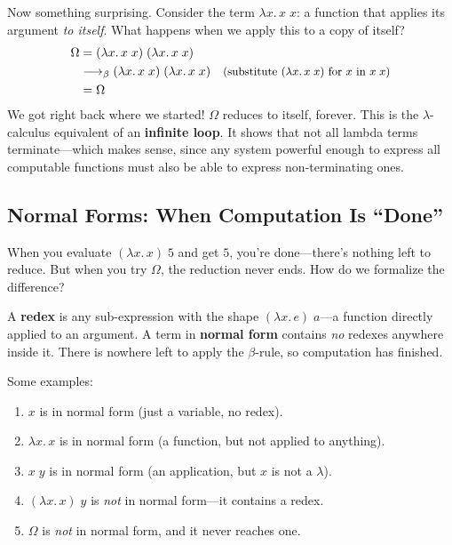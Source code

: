 \documentclass[11pt,a4paper]{article}
\theoremstyle{definition}
\newcommand{\lam}{\lambda}
\newcommand{\reduce}{\longrightarrow_\beta}
\newcommand{\rmark}[1]{\quad\text{\small(#1)}}
\begin{document}
\begin{workedexample}
Now something surprising. Consider the term $\lam x.\, x\;x$: a function that
applies its argument \emph{to itself}. What happens when we apply this to a copy
of itself?
\begin{align*}
  \Omega &= (\lam x.\, x\;x)\;(\lam x.\, x\;x) \\
         &\reduce (\lam x.\, x\;x)\;(\lam x.\, x\;x)
         \rmark{substitute $(\lam x.\, x\;x)$ for $x$ in $x\;x$} \\
         &= \Omega
\end{align*}
We got right back where we started! $\Omega$ reduces to itself, forever. This
is the $\lam$-calculus equivalent of an \textbf{infinite loop}. It shows that
not all lambda terms terminate---which makes sense, since any system powerful
enough to express all computable functions must also be able to express
non-terminating ones.
\end{workedexample}

\subsection{Normal Forms: When Computation Is ``Done''}

When you evaluate $(\lam x.\, x)\; 5$ and get $5$, you're done---there's
nothing left to reduce. But when you try $\Omega$, the reduction never ends.
How do we formalize the difference?

A \textbf{redex} is any sub-expression with the shape $(\lam x.\, e)\; a$---a
function directly applied to an argument. A term in \textbf{normal form}
contains \emph{no} redexes anywhere inside it. There is nowhere left to apply
the $\beta$-rule, so computation has finished.

Some examples:
\begin{enumerate}[leftmargin=2em]
\item $x$ is in normal form (just a variable, no redex).
\item $\lam x.\, x$ is in normal form (a function, but not applied to anything).
\item $x\; y$ is in normal form (an application, but $x$ is not a $\lam$).
\item $(\lam x.\, x)\; y$ is \emph{not} in normal form---it contains a redex.
\item $\Omega$ is \emph{not} in normal form, and it never reaches one.
\end{enumerate}
\end{document}
